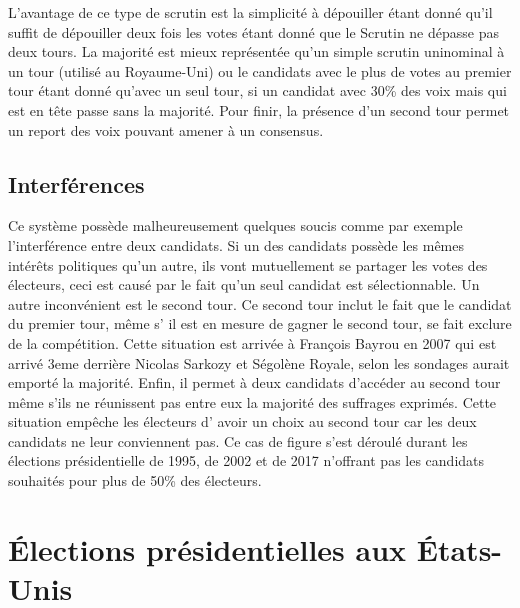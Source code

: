 \documentclass[11pt,a4paper]{report}
\begin{document}
L’avantage de ce type de scrutin est la simplicité à dépouiller étant donné qu’il suffit de dépouiller deux fois les votes étant donné que le Scrutin ne dépasse pas deux tours.
La majorité est mieux représentée qu’un simple scrutin uninominal à un tour (utilisé au Royaume-Uni) ou le candidats avec le plus de votes au premier tour étant donné qu’avec un seul tour, si un candidat avec 30\% des voix mais qui est en tête passe sans la majorité.
Pour finir, la présence d'un second tour permet un report des voix pouvant amener à un consensus.

\subsection{Interférences}

Ce système possède malheureusement quelques soucis comme par exemple l'interférence entre deux candidats.
Si un des candidats possède les mêmes intérêts politiques qu’un autre, ils vont mutuellement se partager les votes des électeurs, ceci est causé par le fait qu’un seul candidat est sélectionnable.
Un autre inconvénient est le second tour.
Ce second tour inclut le fait que le candidat du premier tour, même s' il est en mesure de gagner le second tour, se fait exclure de la compétition.
Cette situation est arrivée à François Bayrou en 2007 qui est arrivé 3eme derrière Nicolas Sarkozy et Ségolène Royale, selon les sondages aurait emporté la majorité.
Enfin, il permet à deux candidats d'accéder au second tour même s'ils ne réunissent pas entre eux la majorité des suffrages exprimés.
Cette situation empêche les électeurs d' avoir un choix au second tour car les deux candidats ne leur conviennent pas.
Ce cas de figure s’est déroulé durant les élections présidentielle de 1995, de 2002 et de 2017 n’offrant pas les candidats souhaités pour plus de 50\% des électeurs.


\section{Élections présidentielles aux États-Unis}
\end{document}
